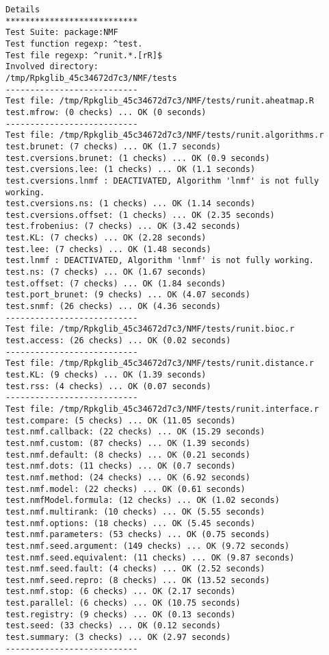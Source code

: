 \documentclass[10pt]{article}\usepackage[]{graphicx}\usepackage[]{color}
\begin{document}
\begin{verbatim}
Details 
*************************** 
Test Suite: package:NMF 
Test function regexp: ^test. 
Test file regexp: ^runit.*.[rR]$ 
Involved directory: 
/tmp/Rpkglib_45c34672d7c3/NMF/tests 
--------------------------- 
Test file: /tmp/Rpkglib_45c34672d7c3/NMF/tests/runit.aheatmap.R 
test.mfrow: (0 checks) ... OK (0 seconds)
--------------------------- 
Test file: /tmp/Rpkglib_45c34672d7c3/NMF/tests/runit.algorithms.r 
test.brunet: (7 checks) ... OK (1.7 seconds)
test.cversions.brunet: (1 checks) ... OK (0.9 seconds)
test.cversions.lee: (1 checks) ... OK (1.1 seconds)
test.cversions.lnmf : DEACTIVATED, Algorithm 'lnmf' is not fully working.
test.cversions.ns: (1 checks) ... OK (1.14 seconds)
test.cversions.offset: (1 checks) ... OK (2.35 seconds)
test.frobenius: (7 checks) ... OK (3.42 seconds)
test.KL: (7 checks) ... OK (2.28 seconds)
test.lee: (7 checks) ... OK (1.48 seconds)
test.lnmf : DEACTIVATED, Algorithm 'lnmf' is not fully working.
test.ns: (7 checks) ... OK (1.67 seconds)
test.offset: (7 checks) ... OK (1.84 seconds)
test.port_brunet: (9 checks) ... OK (4.07 seconds)
test.snmf: (26 checks) ... OK (4.36 seconds)
--------------------------- 
Test file: /tmp/Rpkglib_45c34672d7c3/NMF/tests/runit.bioc.r 
test.access: (26 checks) ... OK (0.02 seconds)
--------------------------- 
Test file: /tmp/Rpkglib_45c34672d7c3/NMF/tests/runit.distance.r 
test.KL: (9 checks) ... OK (1.39 seconds)
test.rss: (4 checks) ... OK (0.07 seconds)
--------------------------- 
Test file: /tmp/Rpkglib_45c34672d7c3/NMF/tests/runit.interface.r 
test.compare: (5 checks) ... OK (11.05 seconds)
test.nmf.callback: (22 checks) ... OK (15.29 seconds)
test.nmf.custom: (87 checks) ... OK (1.39 seconds)
test.nmf.default: (8 checks) ... OK (0.21 seconds)
test.nmf.dots: (11 checks) ... OK (0.7 seconds)
test.nmf.method: (24 checks) ... OK (6.92 seconds)
test.nmf.model: (22 checks) ... OK (0.61 seconds)
test.nmfModel.formula: (12 checks) ... OK (1.02 seconds)
test.nmf.multirank: (10 checks) ... OK (5.55 seconds)
test.nmf.options: (18 checks) ... OK (5.45 seconds)
test.nmf.parameters: (53 checks) ... OK (0.75 seconds)
test.nmf.seed.argument: (149 checks) ... OK (9.72 seconds)
test.nmf.seed.equivalent: (11 checks) ... OK (9.87 seconds)
test.nmf.seed.fault: (4 checks) ... OK (2.52 seconds)
test.nmf.seed.repro: (8 checks) ... OK (13.52 seconds)
test.nmf.stop: (6 checks) ... OK (2.17 seconds)
test.parallel: (6 checks) ... OK (10.75 seconds)
test.registry: (9 checks) ... OK (0.13 seconds)
test.seed: (33 checks) ... OK (0.12 seconds)
test.summary: (3 checks) ... OK (2.97 seconds)
--------------------------- 

\end{verbatim}
\end{document}
